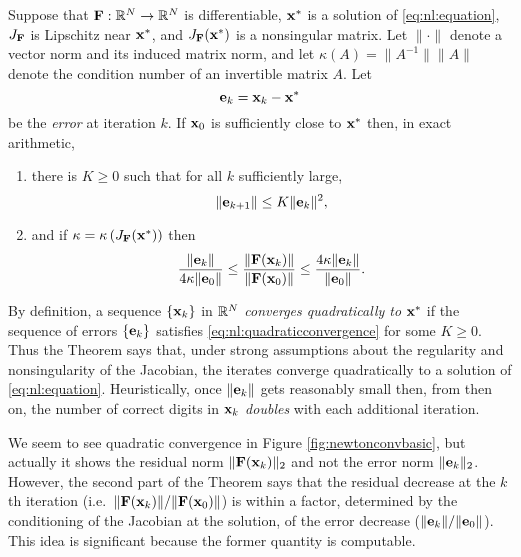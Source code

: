 \begin{theorem}
Suppose that $\mathbf{F}:\mathbb{R}^N\to\mathbb{R}^N$ is differentiable, $\mathbf{x}^*$ is a solution of \eqref{eq:nl:equation}, $J_{\mathbf{F}}$ is Lipschitz near $\mathbf{x}^*$, and $J_{\mathbf{F}}(\mathbf{x}^*)$ is a nonsingular matrix.  Let $\|\cdot\|$ denote a vector norm and its induced matrix norm, and let $\kappa(A)=\|A^{-1}\| \|A\|$ denote the condition number of an invertible matrix $A$.  Let
\begin{equation}
\mathbf{e}_k = \mathbf{x}_k-\mathbf{x}^*
\end{equation}
be the \emph{error} at iteration $k$.  If $\mathbf{x}_0$ is sufficiently close to $\mathbf{x}^*$ then, in exact arithmetic,
\renewcommand{\labelenumi}{(\roman{enumi})}
\begin{enumerate}
\item there is $K\ge 0$ such that for all $k$ sufficiently large,
\begin{equation}
	\|\mathbf{e}_{k+1}\| \le K \|\mathbf{e}_k\|^2, \label{eq:nl:quadraticconvergence}
\end{equation}
\item and if $\kappa = \kappa\left(J_{\mathbf{F}}(\mathbf{x}^*)\right)$ then
\begin{equation}
	\frac{\|\mathbf{e}_k\|}{4 \kappa \|\mathbf{e}_0\|} \le \frac{\|\mathbf{F}(\mathbf{x}_k)\|}{\|\mathbf{F}(\mathbf{x}_0)\|} \le \frac{4 \kappa \|\mathbf{e}_k\|}{\|\mathbf{e}_0\|}. \label{eq:nl:errorresidualnormequiv}
\end{equation}
\end{enumerate}
\end{theorem}

\medskip
By definition, a sequence $\{\mathbf{x}_k\}$ in $\mathbb{R}^N$ \emph{converges quadratically to} $\mathbf{x}^*$ if the sequence of errors $\{\mathbf{e}_k\}$ satisfies \eqref{eq:nl:quadraticconvergence} for some $K\ge 0$.  Thus the Theorem says that, under strong assumptions about the regularity and nonsingularity of the Jacobian, the iterates converge quadratically to a solution of \eqref{eq:nl:equation}.  Heuristically, once $\|\mathbf{e}_k\|$ gets reasonably small then, from then on, the number of correct digits in $\mathbf{x}_k$ \emph{doubles} with each additional iteration.

We seem to see quadratic convergence in Figure \ref{fig:newtonconvbasic}, but actually it shows the residual norm $\|\mathbf{F}(\mathbf{x}_k)\|_2$ and not the error norm $\|\mathbf{e}_k\|_2$.  However, the second part of the Theorem says that the residual decrease at the $k$th iteration (i.e.~$\|\mathbf{F}(\mathbf{x}_k)\|/\|\mathbf{F}(\mathbf{x}_0)\|$) is within a factor, determined by the conditioning of the Jacobian at the solution, of the error decrease ($\|\mathbf{e}_k\|/\|\mathbf{e}_0\|$).  This idea is significant because the former quantity is computable.


